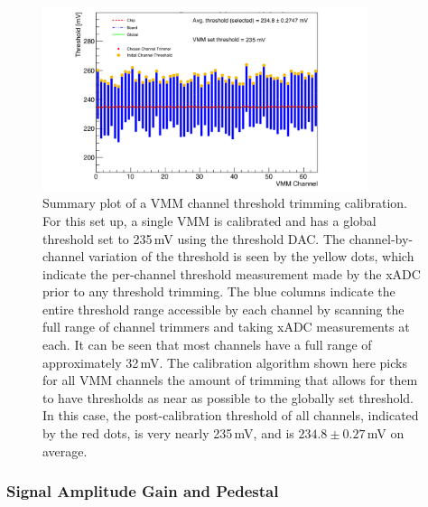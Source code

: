 \begin{figure}[!htb]
    \begin{center}
        \includegraphics[width=0.85\textwidth]{figures/nsw/calibration/channel_threshold_calibPDF}
        \caption{
            Summary plot of a VMM channel threshold trimming calibration.
            For this set up, a single VMM is calibrated and has a global threshold
            set to 235\,mV using the threshold DAC.
            The channel-by-channel variation of the threshold is seen by the yellow dots,
            which indicate the per-channel threshold measurement made by the xADC prior to any
            threshold trimming.
            The blue columns indicate the entire threshold range accessible by each channel
            by scanning the full range of channel trimmers and taking xADC measurements at each.
            It can be seen that most channels have a full range of approximately 32\,mV.
            The calibration algorithm shown here picks for all VMM channels the amount of trimming
            that allows for them to have thresholds as near as possible to the globally set threshold.
            In this case, the post-calibration threshold of all channels, indicated by the red dots,
            is very nearly 235\,mV, and is $234.8\pm 0.27$\,mV on average.
        }
        \label{fig:calib_channel_trim}
    \end{center}
\end{figure}

\subsubsection{Signal Amplitude Gain and Pedestal}
\label{sec:calib_pdo}

